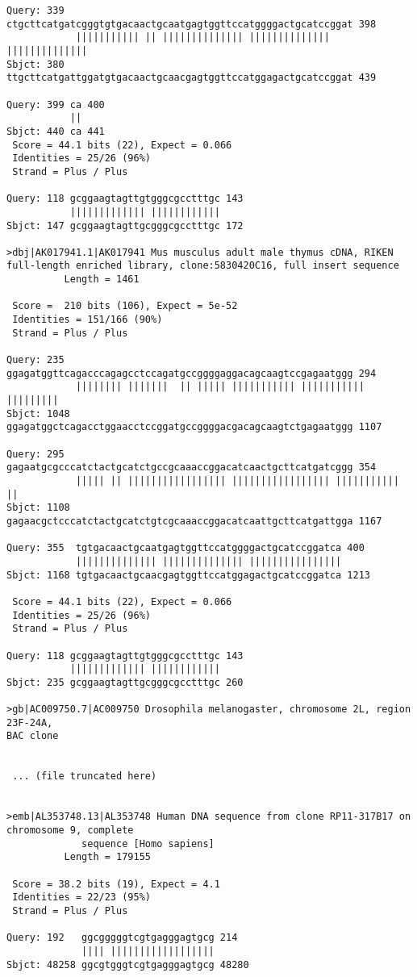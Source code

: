 \begin{lstlisting}
Query: 339 ctgcttcatgatcgggtgtgacaactgcaatgagtggttccatggggactgcatccggat 398
            ||||||||||| || |||||||||||||| |||||||||||||| ||||||||||||||
Sbjct: 380 ttgcttcatgattggatgtgacaactgcaacgagtggttccatggagactgcatccggat 439

Query: 399 ca 400
           ||
Sbjct: 440 ca 441
 Score = 44.1 bits (22), Expect = 0.066
 Identities = 25/26 (96%)
 Strand = Plus / Plus

Query: 118 gcggaagtagttgtgggcgcctttgc 143
           ||||||||||||| ||||||||||||
Sbjct: 147 gcggaagtagttgcgggcgcctttgc 172

>dbj|AK017941.1|AK017941 Mus musculus adult male thymus cDNA, RIKEN
full-length enriched library, clone:5830420C16, full insert sequence
          Length = 1461

 Score =  210 bits (106), Expect = 5e-52
 Identities = 151/166 (90%)
 Strand = Plus / Plus

Query: 235  ggagatggttcagacccagagcctccagatgccggggaggacagcaagtccgagaatggg 294
            |||||||| |||||||  || ||||| ||||||||||| ||||||||||| |||||||||
Sbjct: 1048 ggagatggctcagacctggaacctccggatgccggggacgacagcaagtctgagaatggg 1107

Query: 295  gagaatgcgcccatctactgcatctgccgcaaaccggacatcaactgcttcatgatcggg 354
            ||||| || ||||||||||||||||| ||||||||||||||||| ||||||||||| ||
Sbjct: 1108 gagaacgctcccatctactgcatctgtcgcaaaccggacatcaattgcttcatgattgga 1167

Query: 355  tgtgacaactgcaatgagtggttccatggggactgcatccggatca 400
            |||||||||||||| |||||||||||||| ||||||||||||||||
Sbjct: 1168 tgtgacaactgcaacgagtggttccatggagactgcatccggatca 1213

 Score = 44.1 bits (22), Expect = 0.066
 Identities = 25/26 (96%)
 Strand = Plus / Plus

Query: 118 gcggaagtagttgtgggcgcctttgc 143
           ||||||||||||| ||||||||||||
Sbjct: 235 gcggaagtagttgcgggcgcctttgc 260

>gb|AC009750.7|AC009750 Drosophila melanogaster, chromosome 2L, region 23F-24A,
BAC clone


 ... (file truncated here)


>emb|AL353748.13|AL353748 Human DNA sequence from clone RP11-317B17 on
chromosome 9, complete
             sequence [Homo sapiens]
          Length = 179155

 Score = 38.2 bits (19), Expect = 4.1
 Identities = 22/23 (95%)
 Strand = Plus / Plus

Query: 192   ggcgggggtcgtgagggagtgcg 214
             |||| ||||||||||||||||||
Sbjct: 48258 ggcgtgggtcgtgagggagtgcg 48280


\end{lstlisting}
